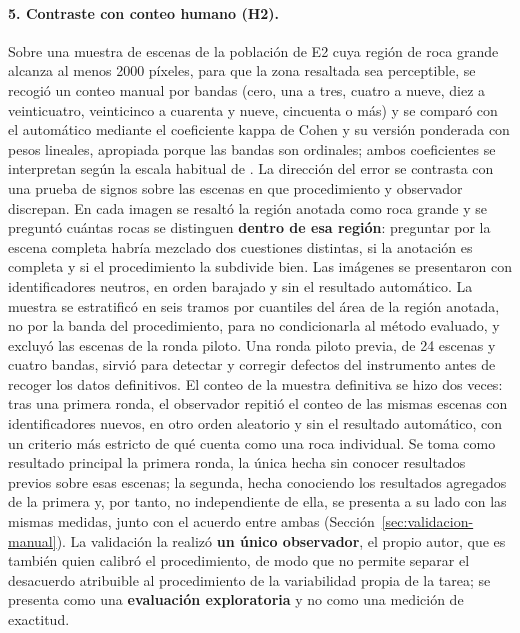 \paragraph{5. Contraste con conteo humano (H2).} Sobre una muestra de \cVN{} escenas de la
población de E2 cuya región de roca grande alcanza al menos \num{2000} píxeles, para que la zona
resaltada sea perceptible, se recogió un conteo manual por bandas (cero, una a tres, cuatro a nueve, diez a
veinticuatro, veinticinco a cuarenta y nueve, cincuenta o más) y se comparó con el automático
mediante el coeficiente kappa de Cohen \citep{cohen1960kappa} y su versión ponderada
\citep{cohen1968weighted} con pesos lineales, apropiada porque las bandas son ordinales; ambos
coeficientes se interpretan según la escala habitual de \citet{landis1977}. La dirección del
error se contrasta con una prueba de signos sobre las escenas en que procedimiento y observador
discrepan. En cada imagen se resaltó la región anotada como roca
grande y se preguntó cuántas rocas se distinguen \textbf{dentro de esa región}: preguntar por
la escena completa habría mezclado dos cuestiones distintas, si la anotación es completa y si el
procedimiento la subdivide bien. Las imágenes se presentaron con identificadores neutros, en
orden barajado y sin el resultado automático. La muestra se estratificó en seis tramos por
cuantiles del área de la región anotada, no por la banda del procedimiento, para no
condicionarla al método evaluado, y excluyó las escenas de la ronda piloto. Una ronda
piloto previa, de \num{24} escenas y cuatro bandas, sirvió para detectar y corregir defectos del
instrumento antes de recoger los datos definitivos. El conteo de la muestra definitiva se hizo dos
veces: tras una primera ronda, el observador repitió el conteo de las mismas escenas con
identificadores nuevos, en otro orden aleatorio y sin el resultado automático, con un criterio más
estricto de qué cuenta como una roca individual. Se toma como resultado principal la primera
ronda, la única hecha sin conocer resultados previos sobre esas escenas; la segunda, hecha
conociendo los resultados agregados de la primera y, por tanto, no independiente de ella, se
presenta a su lado con las mismas medidas, junto con el acuerdo entre ambas
(Sección~\ref{sec:validacion-manual}). La validación la realizó \textbf{un único
observador}, el propio autor, que es también quien calibró el procedimiento, de modo que no permite separar el desacuerdo atribuible al procedimiento de la
variabilidad propia de la tarea; se presenta como una \textbf{evaluación exploratoria} y no como
una medición de exactitud.

